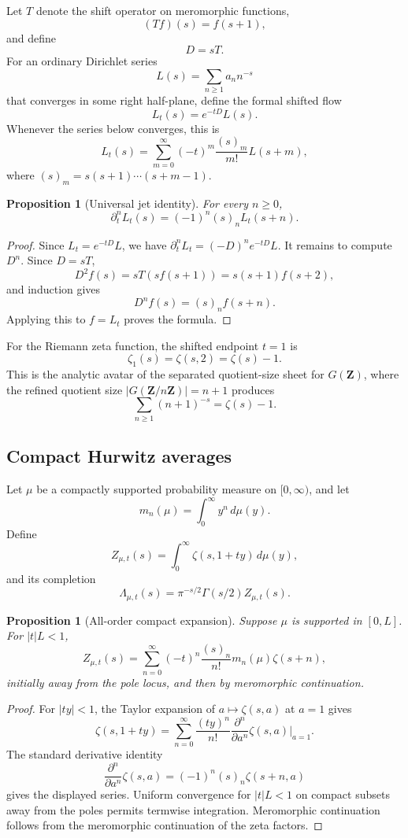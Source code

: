 \documentclass[11pt]{article}
\newcommand{\Z}{\mathbf Z}
\theoremstyle{plain}
\newtheorem{proposition}[theorem]{Proposition}
\theoremstyle{definition}
\begin{document}
Let \(T\) denote the shift operator on meromorphic functions,
\[
   (Tf)(s)=f(s+1),
\]
and define
\[
   D=sT.
\]
For an ordinary Dirichlet series
\[
   L(s)=\sum_{n\ge1}a_n n^{-s}
\]
that converges in some right half-plane, define the formal shifted flow
\[
   L_t(s)=e^{-tD}L(s).
\]
Whenever the series below converges, this is
\[
   L_t(s)=\sum_{m=0}^\infty (-t)^m\frac{(s)_m}{m!}L(s+m),
\]
where \((s)_m=s(s+1)\cdots(s+m-1)\).

\begin{proposition}[Universal jet identity]\label{prop:universal-jet}
For every \(n\ge0\),
\[
   \partial_t^nL_t(s)=(-1)^n(s)_nL_t(s+n).
\]
\end{proposition}

\begin{proof}
Since \(L_t=e^{-tD}L\), we have \(\partial_t^nL_t=(-D)^ne^{-tD}L\).  It remains to compute \(D^n\).  Since \(D=sT\),
\[
   D^2 f(s)=sT(sf(s+1))=s(s+1)f(s+2),
\]
and induction gives
\[
   D^n f(s)=(s)_n f(s+n).
\]
Applying this to \(f=L_t\) proves the formula.
\end{proof}

For the Riemann zeta function, the shifted endpoint \(t=1\) is
\[
   \zeta_1(s)=\zeta(s,2)=\zeta(s)-1.
\]
This is the analytic avatar of the separated quotient-size sheet for \(G(\Z)\), where the refined quotient size \(|G(\Z/n\Z)|=n+1\) produces
\[
   \sum_{n\ge1}(n+1)^{-s}=\zeta(s)-1.
\]

\subsection{Compact Hurwitz averages}

Let \(\mu\) be a compactly supported probability measure on \([0,\infty)\), and let
\[
   m_n(\mu)=\int_0^\infty y^n\,d\mu(y).
\]
Define
\[
   Z_{\mu,t}(s)=\int_0^\infty \zeta(s,1+ty)\,d\mu(y),
\]
and its completion
\[
   \Lambda_{\mu,t}(s)=\pi^{-s/2}\Gamma(s/2)Z_{\mu,t}(s).
\]

\begin{proposition}[All-order compact expansion]\label{prop:compact-expansion}
Suppose \(\mu\) is supported in \([0,L]\).  For \(|t|L<1\),
\[
   Z_{\mu,t}(s)=\sum_{n=0}^\infty
   (-t)^n\frac{(s)_n}{n!}m_n(\mu)\zeta(s+n),
\]
initially away from the pole locus, and then by meromorphic continuation.
\end{proposition}

\begin{proof}
For \(|ty|<1\), the Taylor expansion of \(a\mapsto \zeta(s,a)\) at \(a=1\) gives
\[
   \zeta(s,1+ty)=\sum_{n=0}^\infty
   \frac{(ty)^n}{n!}\frac{\partial^n}{\partial a^n}\zeta(s,a)\Big|_{a=1}.
\]
The standard derivative identity
\[
   \frac{\partial^n}{\partial a^n}\zeta(s,a)=(-1)^n(s)_n\zeta(s+n,a)
\]
gives the displayed series.  Uniform convergence for \(|t|L<1\) on compact subsets away from the poles permits termwise integration.  Meromorphic continuation follows from the meromorphic continuation of the zeta factors.
\end{proof}
\end{document}
